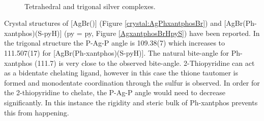 \begin{figure}[htbp]
\begin{subfigure}[b]{0.3\textwidth}
	\caption{}
	\label{AgxantphosBr}
\end{subfigure}
\\
\caption[Silver \Phxantphos{} complexes]{Tetrahedral and trigonal silver \Phxantphos{} complexes.}
\label{AgPhxantphos}
\end{figure}



Crystal structures of [AgBr(\Phxantphos)] (Figure \ref{crystal:AgPhxantphosBr}) and [AgBr(Ph-xantphos)(S-pyH)] (\acrshort{py} = \acrlong{py}, Figure \ref{AgxantphosBrHpyS}) have been reported.\cite{Kaltzoglou2007}  In the trigonal structure the P-Ag-P angle is 109.38(7)\degrees{} which increases to 111.507(17)\degrees{} for [AgBr(Ph-xantphos)(S-pyH)].  The natural bite-angle for Ph-xantphos (111.7\degrees)\cite{Birkholz2009} is very close to the observed bite-angle.  2-Thiopyridine can act as a bidentate chelating ligand, however in this case the thione tautomer is formed and monodentate coordination through the sulfur is observed.  In order for the 2-thiopyridine to chelate, the P-Ag-P angle would need to decrease significantly.  In this instance the rigidity and steric bulk of Ph-xantphos prevents this from happening.\cite{Kaltzoglou2007}


